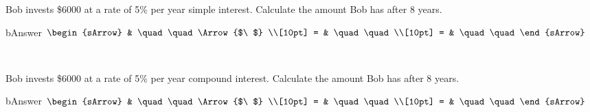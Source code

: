 \begin{mtask}[resume]
  \task Bob invests \$6000 at a rate of 5\% per year simple interest. Calculate the amount Bob has after 8 years.
      \begin{envOut}[height=6cm]{bAnswer}
	       $\begin{sArrow}
	             & \quad\quad       \Arrow{$\ $} \\[10pt]
               = & \quad\quad               \\[10pt]      
			   = & \quad\quad  
	        \end{sArrow}$
      \end{envOut}
	  \begin{shortsolution}  
	     $ \quad \quad \quad \quad$
 	  \end{shortsolution}

  \task Bob invests \$6000 at a rate of 5\% per year compound interest. Calculate the amount Bob has after 8 years.
      \begin{envOut}[height=6cm]{bAnswer}
	       $\begin{sArrow}
	             & \quad\quad       \Arrow{$\ $} \\[10pt]
               = & \quad\quad               \\[10pt]      
			   = & \quad\quad  
	        \end{sArrow}$
      \end{envOut}
	  \begin{shortsolution}  
	     $ \quad \quad \quad \quad$
 	  \end{shortsolution}
\end{mtask}

